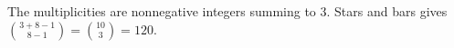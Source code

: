 The multiplicities are nonnegative integers summing to 3. Stars and bars gives $\binom{3+8-1}{8-1}=\binom{10}{3}=\boxed{120}$.
